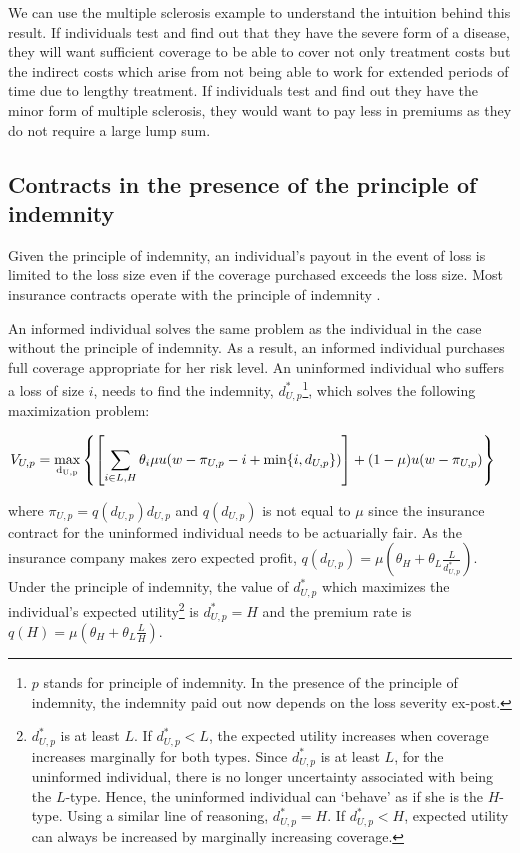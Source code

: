 \documentclass[natbib=false,preprint,12pt]{elsarticle}
\theoremstyle{plain}
\theoremstyle{definition}
\theoremstyle{plain}
\theoremstyle{TheoremNum}
\theoremstyle{CorollaryNum}
\theoremstyle{PropositionNum}
\theoremstyle{TheoremNum}
\begin{document}
We can use the multiple sclerosis example to understand the intuition behind this result. If individuals test and find out that they have the severe form of a disease, they will want sufficient coverage to be able to cover not only treatment costs but the indirect costs which arise from not being able to work for extended periods of time due to lengthy treatment. If individuals test and find out they have the minor form of multiple sclerosis, they would want to pay less in premiums as they do not require a large lump sum.


\subsection{Contracts in the presence of the principle of indemnity}

Given the principle of indemnity, an individual's payout in the event of loss is limited to the loss size even if the coverage purchased exceeds the loss size. Most insurance contracts operate with the principle of indemnity \autocite{rejda2005risk}.

An informed individual solves the same problem as the individual in the case without the principle of indemnity. As a result, an informed individual purchases full coverage appropriate for her risk level. An uninformed individual who suffers a loss of size $i$, needs to find the indemnity, $d_{U,p}^*$\footnote{$p$ stands for principle of indemnity. In the presence of the principle of indemnity, the indemnity paid out now depends on the loss severity ex-post.}, which solves the following maximization problem:

\begin{align}
V_{U,p} = \underset{\rm d_{U,p}}{\rm max } & \left\{\left[\sum_{i \in {L,H}} \theta_i \mu u(w-\pi_{U,p}-i+\text{min}\{i,d_{U,p}\})\right] + (1-\mu)u(w-\pi_{U,p})\right\}
\label{uninformed_p_maxproblem}
\end{align}

where $\pi_{U,p} = q(d_{U,p})d_{U,p}$ and  $q(d_{U,p})$ is not equal to $\mu$ since the insurance contract for the uninformed individual needs to be actuarially fair. As the insurance company makes zero expected profit, $q(d_{U,p}) = \mu (\theta_H + \theta_L \frac{L}{d_{U,p}^*})$. Under the principle of indemnity, the value of $d_{U,p}^*$ which maximizes the individual's expected utility\footnote{$d_{U,p}^*$ is at least $L$. If $d_{U,p}^*<L$, the expected utility increases when coverage increases marginally for both types. Since $d_{U,p}^*$ is at least $L$, for the uninformed individual, there is no longer uncertainty associated with being the $L$-type. Hence, the uninformed individual can `behave' as if she is the $H$-type. Using a similar line of reasoning, $d_{U,p}^* = H$. If $d_{U,p}^*<H$, expected utility can always be increased by marginally increasing coverage.} is $d_{U,p}^*=H$ and the premium rate is $q(H) = \mu (\theta_H + \theta_L \frac{L}{H})$. 
\end{document}
